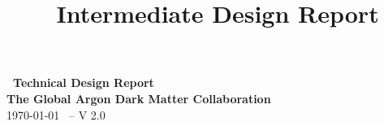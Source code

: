 \documentclass[aps,superscriptaddress,floatfix,nofootinbib,showpacs,amsmath,amssymb,altaffilletter,floatfix,11pt]{revtex4-1}
\begin{document}
\setlength{\parindent}{1em}
\setdefaultleftmargin{1em}{1em}{}{}{}{}
\setcounter{page}{0}\thispagestyle{empty}
\onecolumngrid
\begin{center}
{\bf \LARGE \DSk\ Technical Design Report}\\
\vspace{.5in}
{\bf \Large The Global Argon Dark Matter Collaboration}\\
\vspace{.5in}
\today
{\large\ -- V 2.0}
\end{center}
\vspace{.2in}
%
\clearpage
\newpage
{}
\title{\DSk\ Intermediate Design Report}

\maketitle
\clearpage
\onecolumngrid
\setcounter{tocdepth}{2}
\tableofcontents
\makeatletter
\let\toc@pre\relax
\let\toc@post\relax
\makeatother
\clearpage
\listoffigures
\clearpage
\listoftables
\clearpage
\newpage
{}
\clearpage
\onecolumngrid
\newpage
{}
\clearpage


%
  

  
  
  



 




%






\end{document}
